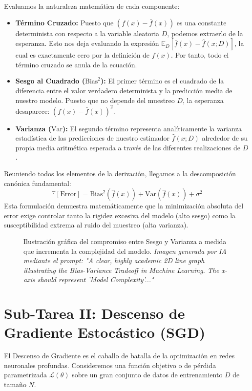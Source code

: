 \documentclass[12pt]{article}
\begin{document}
Evaluamos la naturaleza matemática de cada componente:
\begin{itemize}
    \item \textbf{Término Cruzado:} Puesto que $(f(x) - \bar{f}(x))$ es una constante determinista con respecto a la variable aleatoria $D$, podemos extraerlo de la esperanza. Esto nos deja evaluando la expresión $\mathbb{E}_D[\bar{f}(x) - \hat{f}(x; D)]$, la cual es exactamente cero por la definición de $\bar{f}(x)$. Por tanto, todo el término cruzado se anula de la ecuación.
    \item \textbf{Sesgo al Cuadrado ($\text{Bias}^2$):} El primer término es el cuadrado de la diferencia entre el valor verdadero determinista y la predicción media de nuestro modelo. Puesto que no depende del muestreo $D$, la esperanza desaparece: $(f(x) - \bar{f}(x))^2$.
    \item \textbf{Varianza ($\text{Var}$):} El segundo término representa analíticamente la varianza estadística de las predicciones de nuestro estimador $\hat{f}(x; D)$ alrededor de su propia media aritmética esperada a través de las diferentes realizaciones de $D$.
\end{itemize}

Reuniendo todos los elementos de la derivación, llegamos a la descomposición canónica fundamental:
\begin{equation}
    \mathbb{E}\left[ \text{Error} \right] = \text{Bias}^2(\hat{f}(x)) + \text{Var}(\hat{f}(x)) + \sigma^2
\end{equation}
Esta formulación demuestra matemáticamente que la minimización absoluta del error exige controlar tanto la rigidez excesiva del modelo (alto sesgo) como la susceptibilidad extrema al ruido del muestreo (alta varianza).

\begin{figure}[h!]
    \centering
    \caption{Ilustración gráfica del compromiso entre Sesgo y Varianza a medida que incrementa la complejidad del modelo. \textit{Imagen generada por IA mediante el prompt: "A clear, highly academic 2D line graph illustrating the Bias-Variance Tradeoff in Machine Learning. The x-axis should represent 'Model Complexity'..."}}
    \label{fig:bias_var}
\end{figure}

\newpage
\section*{Sub-Tarea II: Descenso de Gradiente Estocástico (SGD)}
El Descenso de Gradiente es el caballo de batalla de la optimización en redes neuronales profundas. Consideremos una función objetivo o de pérdida parametrizada $\mathcal{L}(\theta)$ sobre un gran conjunto de datos de entrenamiento $D$ de tamaño $N$.
\end{document}
